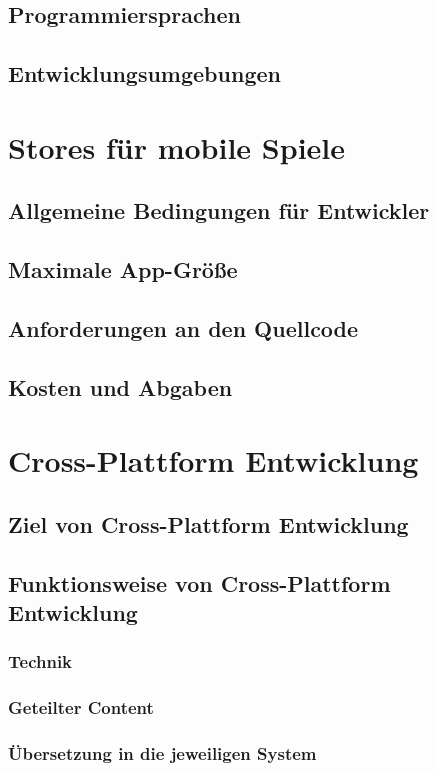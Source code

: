 \section{Programmiersprachen}
\section{Entwicklungsumgebungen}

\chapter{Stores für mobile Spiele}
\section{Allgemeine Bedingungen für Entwickler}
\section{Maximale App-Größe}
\section{Anforderungen an den Quellcode}
\section{Kosten und Abgaben}

\chapter{Cross-Plattform Entwicklung}
\section{Ziel von Cross-Plattform Entwicklung}
\section{Funktionsweise von Cross-Plattform Entwicklung}
\subsection{Technik}
\subsection{Geteilter Content}
\subsection{Übersetzung in die jeweiligen System}

